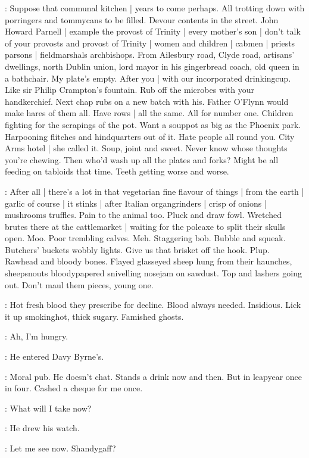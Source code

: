 \BloomInt:
Suppose that communal kitchen |
years to come perhaps.
All trotting down with porringers and tommycans to be filled.
Devour contents in the street.
John Howard Parnell |
example the provost of Trinity |
every mother's son |
don't talk of your provosts and provost of Trinity |
women and children |
cabmen |
priests parsons |
fieldmarshals archbishops.
From Ailesbury road,
Clyde road,
artisans' dwellings,
north Dublin union,
lord mayor in his gingerbread coach,
old queen in a bathchair.
My plate's empty.
After you |
with our incorporated drinkingcup.
Like sir Philip Crampton's fountain.
Rub off the microbes with your handkerchief.
Next chap rubs on a new batch with his.
Father O'Flynn would make hares of them all.
Have rows |
all the same.
All for number one.
Children fighting for the scrapings of the pot.
Want a souppot as big as the Phoenix park.
Harpooning flitches and hindquarters out of it.
Hate people all round you.
City Arms hotel |
 she called it.
Soup, joint and sweet.
Never know whose thoughts you're chewing.
Then who'd wash up all the plates and forks?
Might be all feeding on tabloids that time.
Teeth getting worse and worse.

\BloomInt:
After all |
there's a lot in that vegetarian fine flavour of things |
from the earth |
garlic of course |
it stinks |
after Italian organgrinders |
crisp of onions |
mushrooms truffles.
Pain to the animal too.
Pluck and draw fowl.
Wretched brutes there at the cattlemarket |
waiting for the poleaxe to split their skulls open.
Moo.
Poor trembling calves.
Meh.
Staggering bob.
Bubble and squeak.
Butchers' buckets wobbly lights.
Give us that brisket off the hook.
Plup.
Rawhead and bloody bones.
Flayed glasseyed sheep hung from their haunches,
sheepsnouts bloodypapered snivelling nosejam on sawdust.
Top and lashers going out.
Don't maul them pieces, young one.

\BloomInt:
Hot fresh blood they prescribe for decline.
Blood always needed.
Insidious.
Lick it up smokinghot, thick sugary.
Famished ghosts.

\BloomInt:
Ah, I'm hungry.

:
He entered Davy Byrne's.

\BloomInt:
Moral pub.
He doesn't chat.
Stands a drink now and then.
But in leapyear once in four.
Cashed a cheque for me once.

\BloomInt:
What will I take now?

:
He drew his watch.

\BloomInt:
Let me see now.
Shandygaff?

